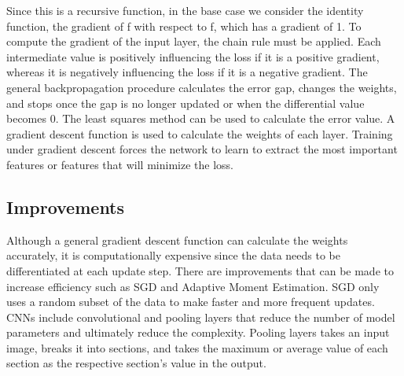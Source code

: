 \documentclass[10pt,twocolumn]{article}
\begin{document}
Since this is a recursive function, in the base case we consider the identity function, the gradient of f with respect to f, which has a gradient of 1. To compute the gradient of the input layer, the chain rule must be applied. Each intermediate value is positively influencing the loss if it is a positive gradient, whereas it is negatively influencing the loss if it is a negative gradient. The general backpropagation procedure calculates the error gap, changes the weights, and stops once the gap is no longer updated or when the differential value becomes 0. The least squares method can be used to calculate the error value. A gradient descent function is used to calculate the weights of each layer. Training under gradient descent forces the network to learn to extract the most important features or features that will minimize the loss. 

\subsection{Improvements}
Although a general gradient descent function can calculate the weights accurately, it is computationally expensive since the data needs to be differentiated at each update step. There are improvements that can be made to increase efficiency such as SGD and Adaptive Moment Estimation. SGD only uses a random subset of the data to make faster and more frequent updates. CNNs include convolutional and pooling layers that reduce the number of model parameters and ultimately reduce the complexity. Pooling layers takes an input image, breaks it into sections, and takes the maximum or average value of each section as the respective section’s value in the output. 
\end{document}
